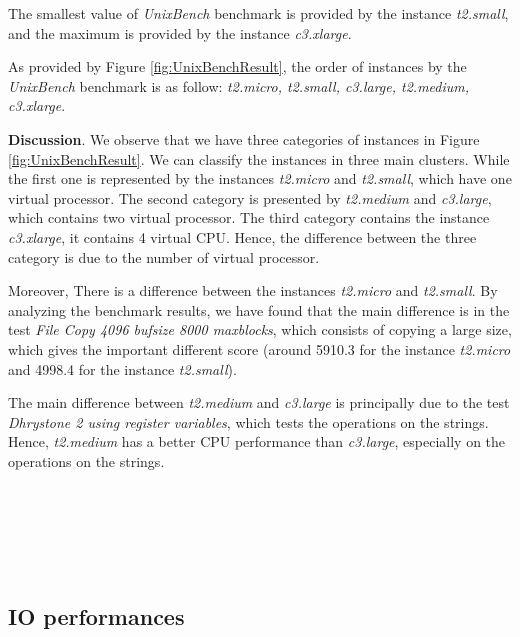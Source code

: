 \documentclass[10pt, conference]{IEEEtran}
\begin{document}
The smallest value of \textit{UnixBench} benchmark is provided by the instance \textit{t2.small}, and the maximum is provided by the instance \textit{c3.xlarge}.

As provided by Figure \ref{fig:UnixBenchResult}, the order of instances by the \textit{UnixBench} benchmark is as follow: \textit{t2.micro, t2.small, c3.large, t2.medium, c3.xlarge}.

\textbf{Discussion}. We observe that we have three categories of instances in Figure \ref{fig:UnixBenchResult}. We can classify the instances in three main clusters. While the first one is represented by the instances \textit{t2.micro} and \textit{t2.small}, which have one virtual processor. The second category is presented by \textit{t2.medium} and \textit{c3.large}, which contains two virtual processor. The third category contains the instance \textit{c3.xlarge}, it contains 4 virtual CPU. Hence, the difference between the three category is due to the number of virtual processor.

Moreover, There is a difference between the instances \textit{t2.micro} and \textit{t2.small}. By analyzing the benchmark results, we have found that the main difference is in the test \textit{File Copy 4096 bufsize 8000 maxblocks}, which consists of copying a large size, which gives the important different score (around 5910.3 for the instance \textit{t2.micro} and 4998.4 for the instance \textit{t2.small}). 

The main difference between \textit{t2.medium} and \textit{c3.large} is principally due to the test \textit{Dhrystone 2 using register variables}, which tests the operations on the strings. Hence, \textit{t2.medium} has a better CPU performance than \textit{c3.large}, especially on the operations on the strings.


\

\noindent{}

\

\

\subsection{IO performances}
\end{document}
